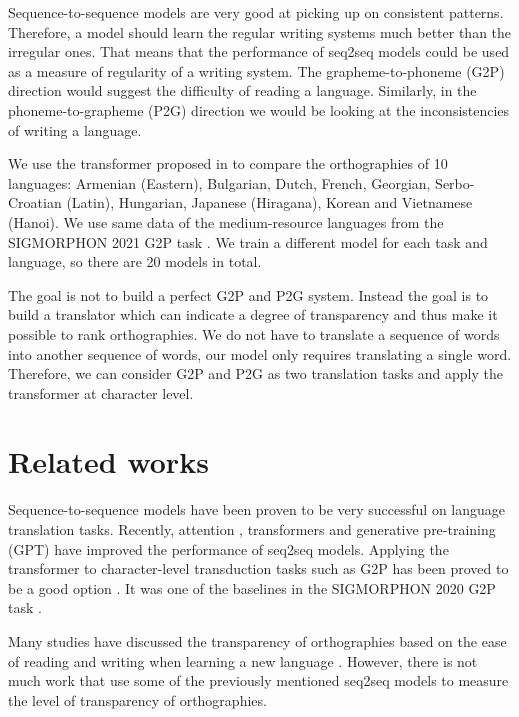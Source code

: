 \documentclass[11pt,a4paper]{article}
\begin{document}
Sequence-to-sequence models are very good at picking up on consistent patterns. Therefore, a model should learn the regular writing systems much better than the irregular ones. That means that the performance of seq2seq models could be used as a measure of regularity of a writing system. The grapheme-to-phoneme (G2P) direction would suggest the difficulty of reading a language. Similarly, in the phoneme-to-grapheme (P2G) direction we would be looking at the inconsistencies of writing a language.

We use the transformer proposed in \citet{wu2021applying} to compare the orthographies of 10 languages: Armenian (Eastern), Bulgarian, Dutch, French, Georgian, Serbo-Croatian (Latin), Hungarian, Japanese (Hiragana), Korean and Vietnamese (Hanoi). We use same data of the medium-resource languages from the SIGMORPHON 2021 G2P task \cite{ashby-etal-2021-results}. We train a different model for each task and language, so there are 20 models in total.

The goal is not to build a perfect G2P and P2G system. Instead the goal is to build a translator which can indicate a degree of transparency and thus make it possible to rank orthographies. We do not have to translate a
sequence of words into another sequence of words, our model only requires translating a single word. Therefore, we can consider G2P and P2G as two translation tasks and apply the transformer at character level.

\section{Related works}

Sequence-to-sequence models have been proven to be very successful on language translation tasks. Recently, attention \cite{bahdanau2016neural}, transformers \cite{vaswani2017attention} and generative pre-training (GPT) \cite{Radford2018ImprovingLU} have improved the performance of seq2seq models. Applying the transformer to character-level transduction tasks such as G2P has been proved to be a good option \cite{wu2021applying}. It was one of the baselines in the SIGMORPHON 2020 G2P task \cite{gorman-etal-2020-sigmorphon}.

Many studies have discussed the transparency of orthographies based on the ease of reading and writing when learning a new language \cite{borleffs2017measuring}. However, there is not much work that use some of the previously mentioned seq2seq models to measure the level of transparency of orthographies.
\end{document}
